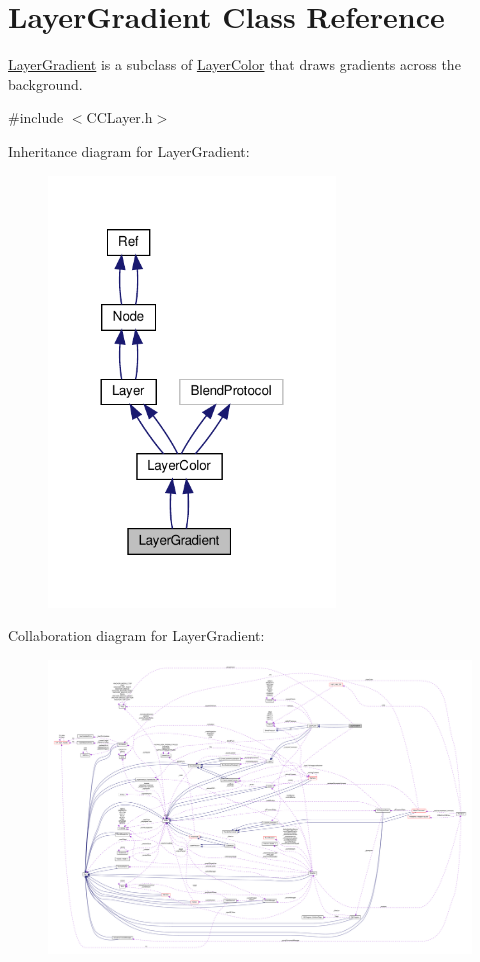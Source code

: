 \hypertarget{classLayerGradient}{}\section{Layer\+Gradient Class Reference}
\label{classLayerGradient}


\hyperlink{classLayerGradient}{Layer\+Gradient} is a subclass of \hyperlink{classLayerColor}{Layer\+Color} that draws gradients across the background.  




{\ttfamily \#include $<$C\+C\+Layer.\+h$>$}



Inheritance diagram for Layer\+Gradient\+:
\nopagebreak
\begin{figure}[H]
\begin{center}
\leavevmode
\includegraphics[width=216pt]{classLayerGradient__inherit__graph}
\end{center}
\end{figure}


Collaboration diagram for Layer\+Gradient\+:
\nopagebreak
\begin{figure}[H]
\begin{center}
\leavevmode
\includegraphics[width=350pt]{classLayerGradient__coll__graph}
\end{center}
\end{figure}
